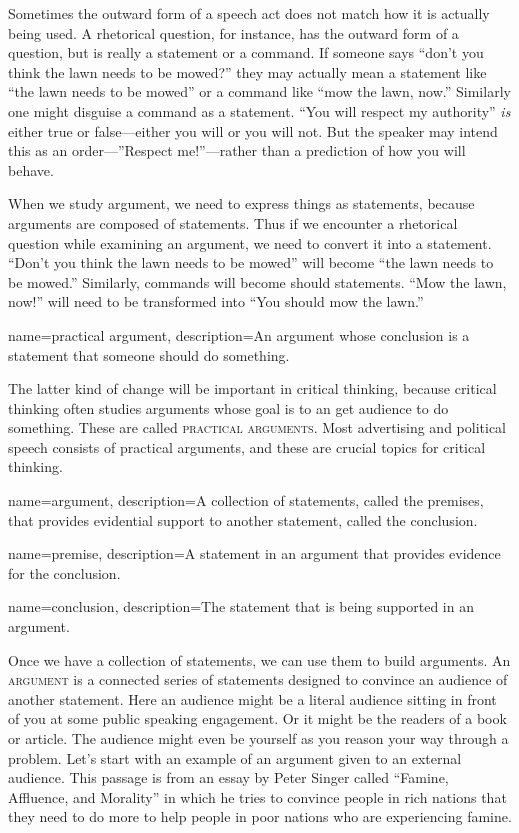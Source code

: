 Sometimes the outward form of a speech act does not match how it is actually being used. A rhetorical question, for instance, has the outward form of a question, but is really a statement or a command. If someone says ``don't you think the lawn needs to be mowed?'' they may actually mean a statement like ``the lawn needs to be mowed'' or a command like ``mow the lawn, now.'' Similarly one might disguise a command as a statement. ``You will respect my authority'' \emph{is} either true or false---either you will or you will not. But the speaker may intend this as an order---''Respect me!''---rather than a prediction of how you will behave.

When we study argument, we need to express things as statements, because arguments are composed of statements. Thus if we encounter a rhetorical question while examining an argument, we need to convert it into a statement. ``Don't you think the lawn needs to be mowed'' will become ``the lawn needs to be mowed.'' Similarly, commands will become should statements. ``Mow the lawn, now!'' will need to be transformed into ``You should mow the lawn.''

{
name=practical argument,
description={An argument whose conclusion is a statement that someone should do something.}
}

The latter kind of change will be important in critical thinking, because critical thinking often studies arguments whose goal is to an get audience to do something. These are called \textsc{\glspl{practical argument}}\label{def:practical_argument}. Most advertising and political speech consists of practical arguments, and these are crucial topics for critical thinking.

{
name=argument,
description={A collection of statements, called the premises, that provides evidential support to another statement, called the conclusion.}
}

{
name=premise,
description={A statement in an argument that provides evidence for the conclusion.}
}

{
name=conclusion,
description={The statement that is being supported in an argument.}
}


Once we have a collection of statements, we can use them to build arguments. An \textsc{\gls{argument}} \label{def:argument} is a connected series of statements designed to convince an audience of another statement. Here an audience might be a literal audience sitting in front of you at some public speaking engagement. Or it might be the readers of a book or article. The audience might even be yourself as you reason your way through a problem. Let's start with an example of an argument given to an external audience. This passage is from an essay by Peter Singer called ``Famine, Affluence, and Morality'' in which he tries to convince people in rich nations that they need to do more to help people in poor nations who are experiencing famine.

